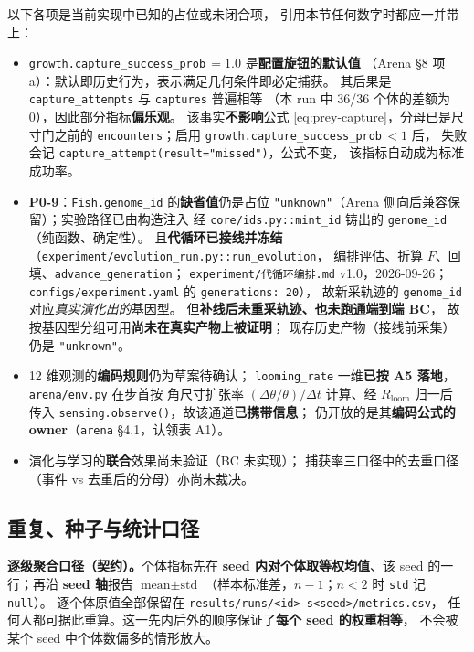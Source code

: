 以下各项是当前实现中已知的占位或未闭合项，
引用本节任何数字时都应一并带上：

\begin{itemize}
  \item \texttt{growth.capture\_success\_prob}\,$=1.0$ 是\textbf{配置旋钮的默认值}
        （Arena \S8 项 a）：默认即历史行为，表示满足几何条件即必定捕获。
        其后果是 \texttt{capture\_attempts} 与 \texttt{captures} 普遍相等
        （本 run 中 36/36 个体的差额为 0），因此部分指标\textbf{偏乐观}。
        该事实\textbf{不影响}公式 \eqref{eq:prey-capture}，分母已是尺寸门之前的
        \texttt{encounters}；启用 \texttt{growth.capture\_success\_prob}\,$<1$ 后，
        失败会记 \texttt{capture\_attempt(result="missed")}，公式不变，
        该指标自动成为标准成功率。
  \item \textbf{P0-9}：\texttt{Fish.genome\_id} 的\textbf{缺省值}仍是占位
        \texttt{"unknown"}（Arena 侧向后兼容保留）；实验路径已由构造注入
        经 \texttt{core/ids.py::mint\_id} 铸出的 \texttt{genome\_id}（纯函数、确定性）。
        且\textbf{代循环已接线并冻结}（\texttt{experiment/evolution\_run.py::run\_evolution}，
        编排评估、折算 $F$、回填、\texttt{advance\_generation}；
        \texttt{experiment/代循环编排.md} v1.0，2026-09-26；
        \texttt{configs/experiment.yaml} 的 \texttt{generations: 20}），
        故新采轨迹的 \texttt{genome\_id} 对应\emph{真实演化出的}基因型。
        但\textbf{补线后未重采轨迹、也未跑通端到端 BC}，
        故按基因型分组可用\textbf{尚未在真实产物上被证明}；
        现存历史产物（接线前采集）仍是 \texttt{"unknown"}。
  \item 12 维观测的\textbf{编码规则}仍为草案待确认；
        \texttt{looming\_rate} 一维\textbf{已按 A5 落地}，\texttt{arena/env.py} 在步首按
        角尺寸扩张率 $(\Delta\theta/\theta)/\Delta t$ 计算、经 $R_{\text{loom}}$ 归一后
        传入 \texttt{sensing.observe()}，故该通道\textbf{已携带信息}；
        仍开放的是其\textbf{编码公式的 owner}（\texttt{arena} \S{}4.1，认领表 A1）。
  \item 演化与学习的\textbf{联合}效果尚未验证（BC 未实现）；
        捕获率三口径中的去重口径（事件 vs 去重后的分母）亦尚未裁决。
\end{itemize}

\subsection{重复、种子与统计口径}\label{sec:exp-stats}

\textbf{逐级聚合口径（契约）。}个体指标先在 \textbf{seed 内对个体取等权均值}、该 seed 的一行；再沿 \textbf{seed 轴}报告 $\text{mean}\pm\text{std}$
（样本标准差，$n-1$；$n<2$ 时 \texttt{std} 记 \texttt{null}）。
逐个体原值全部保留在 \texttt{results/runs/<id>-s<seed>/metrics.csv}，
任何人都可据此重算。这一先内后外的顺序保证了\textbf{每个 seed 的权重相等}，
不会被某个 seed 中个体数偏多的情形放大。

